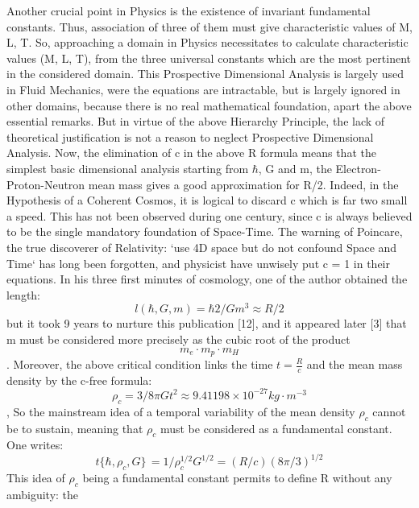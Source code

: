 \documentclass[twoside,draft]{article}
\begin{document}
\begin{sloppypar}
{Another crucial point in Physics is the existence of invariant fundamental constants. Thus,
association of three of them must give characteristic values of M, L, T. So, approaching a domain in
Physics necessitates to calculate characteristic values (M, L, T), from the three universal constants
which are the most pertinent in the considered domain. This Prospective Dimensional Analysis is
largely used in Fluid Mechanics, were the equations are intractable, but is largely ignored in other
domains, because there is no real mathematical foundation, apart the above essential remarks. But
in virtue of the above Hierarchy Principle, the lack of theoretical justification is not a reason to
neglect Prospective Dimensional Analysis.
Now, the elimination of c in the above R formula means that the simplest basic dimensional
analysis starting from $\hbar$, G and m, the Electron-Proton-Neutron mean mass gives a good
approximation for R/2. Indeed, in the Hypothesis of a Coherent Cosmos, it is logical to discard c
which is far two small a speed. This has not been observed during one century, since c is always
believed to be the single mandatory foundation of Space-Time. The warning of Poincare, the true
discoverer of Relativity: `use 4D space but do not confound Space and Time` has long been
forgotten, and physicist have unwisely put c = 1 in their equations.
In his three first minutes of cosmology, one of the author obtained the length:
\begin{equation}
l (\hbar,G,m) = \hbar 2 /Gm^{3} \approx R/2
\end{equation}
but it took 9 years to nurture this publication [12], and it appeared later [3] that m must be considered more precisely as the cubic root of the product 
\begin{equation}
m_{e} \cdot m_{p} \cdot m_{H}
\end{equation}. Moreover, the above critical condition
links the time $t = \frac{R}{c}$ and the mean mass density by the c-free formula:
\begin{equation}
\rho_{c} = 3/8\pi Gt^{2} \approx 9.41198 \times 10^{-27} kg \cdot m^{-3}
\end{equation}
, So the mainstream idea of a temporal variability of the mean density $\rho_{c}$ cannot be to
sustain, meaning that $\rho_{c}$ must be considered as a fundamental constant. One writes:
\begin{equation}
t\{\hbar,\rho_{c} ,G\}\, = 1/\rho_{c}^{1/2} G^{1/2} = (R/c) (8\pi/3)^{1/2}
\end{equation}
This idea of $\rho_{c}$ being a fundamental constant permits to define R without any ambiguity: the
}
\end{sloppypar}
\end{document}
